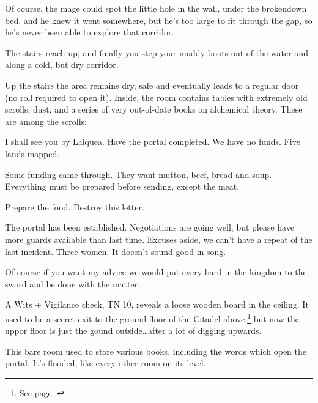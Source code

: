\begin{multicols}{2}
Of course, the mage could spot the little hole in the wall, under the brokendown bed, and he knew it went somewhere, but he's too large to fit through the gap, so he's never been able to explore that corridor.


\begin{boxtext}
	The stairs reach up, and finally you step your muddy boots out of the water and along a cold, but dry corridor.

\end{boxtext}

Up the stairs the area remains dry, safe and eventually leads to a regular door (no roll required to open it).  Inside, the room contains tables with extremely old scrolls, dust, and a series of very out-of-date books on alchemical theory.  These are among the scrolls:

\begin{boxtext}

	I shall see you by Laiquea.  Have the portal completed.  We have no funds.  Five lands mapped.

\end{boxtext}

\begin{boxtext}
	Some funding came through.  They want mutton, beef, bread and soup.  Everything must be prepared before sending, except the meat.

	Prepare the food.  Destroy this letter.
\end{boxtext}


\begin{boxtext}
	The portal has been established.  Negotiations are going well, but please have more guards available than last time.  Excuses aside, we can't have a repeat of the last incident.  Three women.  It doesn't sound good in song.

	Of course if you want my advice we would put every bard in the kingdom to the sword and be done with the matter.

\end{boxtext}

A Wits + Vigilance check, TN 10, reveals a loose wooden board in the ceiling.  It used to be a secret exit to the ground floor of the Citadel above,\footnote{See page \pageref{lost_citadel}.} but now the uppor floor is just the gound outside\ldots after a lot of digging upwards.



This bare room used to store various books, including the words which open the portal.  It's flooded, like every other room on its level.



\end{multicols}
